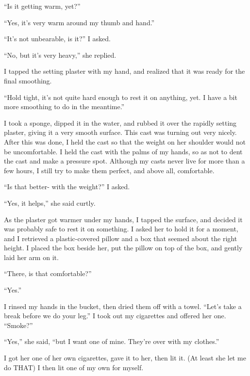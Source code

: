     ``Is it getting warm, yet?''

    ``Yes, it's very warm around my thumb and hand.''

    ``It's not unbearable, is it?'' I asked.

    ``No, but it's very heavy,'' she replied.

    I tapped the setting plaster with my hand, and realized that it was ready for the final
smoothing.

    ``Hold tight, it's not quite hard enough to rest it on anything, yet. I have a bit more
smoothing to do in the meantime.''

    I took a sponge, dipped it in the water, and rubbed it over the rapidly setting plaster,
giving it a very smooth surface. This cast was turning out very nicely. After this was done, I
held the cast so that the weight on her shoulder would not be uncomfortable. I held the cast
with the palms of my hands, so as not to dent the cast and make a pressure spot. Although my
casts never live for more than a few hours, I still try to make them perfect, and above all,
comfortable.

    ``Is that better- with the weight?'' I asked.

    ``Yes, it helps,'' she said curtly.

    As the plaster got warmer under my hands, I tapped the surface, and decided it was probably
safe to rest it on something. I asked her to hold it for a moment, and I retrieved a
plastic-covered pillow and a box that seemed about the right height. I placed the box beside
her, put the pillow on top of the box, and gently laid her arm on it.

    ``There, is that comfortable?''

    ``Yes.''

    I rinsed my hands in the bucket, then dried them off with a towel. ``Let's take a break
before we do your leg.'' I took out my cigarettes and offered her one. ``Smoke?''

    ``Yes,'' she said, ``but I want one of mine. They're over with my clothes.''

    I got her one of her own cigarettes, gave it to her, then lit it. (At least she let me do
THAT) I then lit one of my own for myself.

